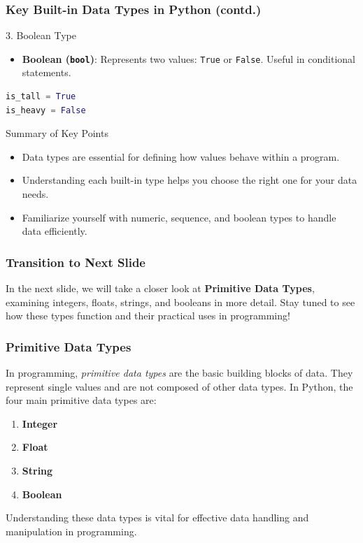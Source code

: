 \documentclass{beamer}
\begin{document}
\begin{frame}[fragile]
    \frametitle{Key Built-in Data Types in Python (contd.)}
    
    \begin{block}{3. Boolean Type}
        \begin{itemize}
            \item \textbf{Boolean (\texttt{bool})}: Represents two values: \texttt{True} or \texttt{False}. Useful in conditional statements.
        \end{itemize}
        \begin{lstlisting}[language=Python]
is_tall = True
is_heavy = False
        \end{lstlisting}
    \end{block}
    
    \begin{block}{Summary of Key Points}
        \begin{itemize}
            \item Data types are essential for defining how values behave within a program.
            \item Understanding each built-in type helps you choose the right one for your data needs.
            \item Familiarize yourself with numeric, sequence, and boolean types to handle data efficiently.
        \end{itemize}
    \end{block}
\end{frame}

\begin{frame}[fragile]
    \frametitle{Transition to Next Slide}
    
    In the next slide, we will take a closer look at \textbf{Primitive Data Types}, examining integers, floats, strings, and booleans in more detail. Stay tuned to see how these types function and their practical uses in programming!
\end{frame}

\begin{frame}[fragile]
    \frametitle{Primitive Data Types}
    In programming, \emph{primitive data types} are the basic building blocks of data. 
    They represent single values and are not composed of other data types. 
    In Python, the four main primitive data types are:
    \begin{enumerate}
        \item \textbf{Integer}
        \item \textbf{Float}
        \item \textbf{String}
        \item \textbf{Boolean}
    \end{enumerate}
    Understanding these data types is vital for effective data handling and manipulation in programming.
\end{frame}
\end{document}
